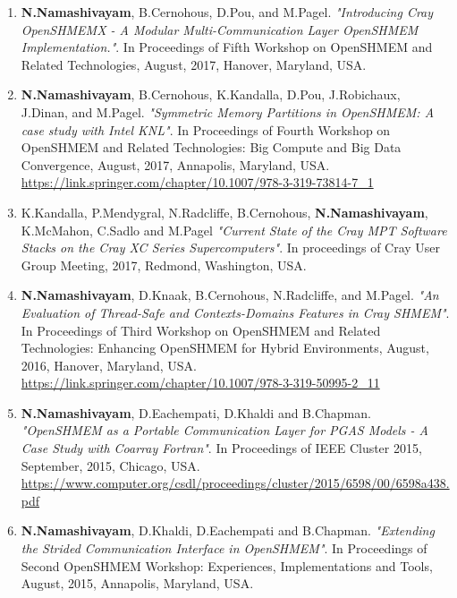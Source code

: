 \begin{enumerate}
\setcounter{enumi}{0}
\item \textbf{N.Namashivayam}, B.Cernohous, D.Pou, and M.Pagel.
      \textit{"Introducing Cray OpenSHMEMX - A Modular Multi-Communication Layer
      OpenSHMEM Implementation."}. In Proceedings of Fifth Workshop on OpenSHMEM
      and Related Technologies, August, 2017, Hanover, Maryland, USA.
\item \textbf{N.Namashivayam}, B.Cernohous, K.Kandalla, D.Pou,
      J.Robichaux, J.Dinan, and M.Pagel.
      \textit{"Symmetric Memory Partitions in OpenSHMEM: A case study with
      Intel KNL"}. In Proceedings of Fourth Workshop on OpenSHMEM and
      Related Technologies: Big Compute and Big Data Convergence, August,
      2017, Annapolis, Maryland, USA.\\
      \url{https://link.springer.com/chapter/10.1007/978-3-319-73814-7_1}
\item K.Kandalla, P.Mendygral, N.Radcliffe, B.Cernohous,
      \textbf{N.Namashivayam}, K.McMahon, C.Sadlo and M.Pagel
      \textit{"Current State of the Cray MPT Software Stacks on the Cray XC
      Series Supercomputers"}. In proceedings of Cray User Group Meeting,
      2017, Redmond, Washington, USA.
\item \textbf{N.Namashivayam}, D.Knaak, B.Cernohous, N.Radcliffe, and
      M.Pagel.
      \textit{"An Evaluation of Thread-Safe and Contexts-Domains Features in
      Cray SHMEM"}. In Proceedings of Third Workshop on OpenSHMEM and Related
      Technologies: Enhancing OpenSHMEM for Hybrid Environments, August, 2016,
      Hanover, Maryland, USA.\\
      \url{https://link.springer.com/chapter/10.1007/978-3-319-50995-2_11}
\item \textbf{N.Namashivayam}, D.Eachempati, D.Khaldi and B.Chapman.
      \textit{"OpenSHMEM as a Portable Communication Layer for PGAS Models - A
      Case Study with Coarray Fortran"}. In Proceedings of IEEE Cluster 2015,
      September, 2015, Chicago, USA.\\
      \url{https://www.computer.org/csdl/proceedings/cluster/2015/6598/00/6598a438.pdf}
\item \textbf{N.Namashivayam}, D.Khaldi, D.Eachempati and B.Chapman.
      \textit{"Extending the Strided Communication Interface in OpenSHMEM"}. In
      Proceedings of Second OpenSHMEM Workshop: Experiences, Implementations and
      Tools, August, 2015, Annapolis, Maryland, USA.\\

\end{enumerate}
